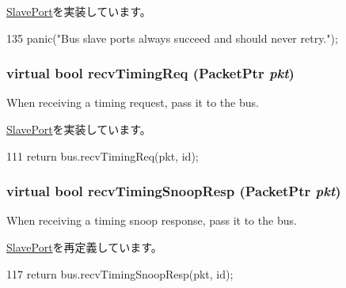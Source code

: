 \hyperlink{classSlavePort_ac1ccc3bcf7ebabb20b57fab99b2be5b0}{SlavePort}を実装しています。


\begin{DoxyCode}
135         { panic("Bus slave ports always succeed and should never retry.\n"); }
\end{DoxyCode}
\hypertarget{classCoherentBus_1_1CoherentBusSlavePort_ad3786e65574e70ec0a5bd2b0ce311d20}{
\subsubsection[{recvTimingReq}]{\setlength{\rightskip}{0pt plus 5cm}virtual bool recvTimingReq ({\bf PacketPtr} {\em pkt})}}
\label{classCoherentBus_1_1CoherentBusSlavePort_ad3786e65574e70ec0a5bd2b0ce311d20}
When receiving a timing request, pass it to the bus. 

\hyperlink{classSlavePort_abcece77e42f88ee41af8d3d01bb48253}{SlavePort}を実装しています。


\begin{DoxyCode}
111         { return bus.recvTimingReq(pkt, id); }
\end{DoxyCode}
\hypertarget{classCoherentBus_1_1CoherentBusSlavePort_ae808ca0180bf333d9072270ed66f17fe}{
\subsubsection[{recvTimingSnoopResp}]{\setlength{\rightskip}{0pt plus 5cm}virtual bool recvTimingSnoopResp ({\bf PacketPtr} {\em pkt})}}
\label{classCoherentBus_1_1CoherentBusSlavePort_ae808ca0180bf333d9072270ed66f17fe}
When receiving a timing snoop response, pass it to the bus. 

\hyperlink{classSlavePort_ae808ca0180bf333d9072270ed66f17fe}{SlavePort}を再定義しています。


\begin{DoxyCode}
117         { return bus.recvTimingSnoopResp(pkt, id); }
\end{DoxyCode}


